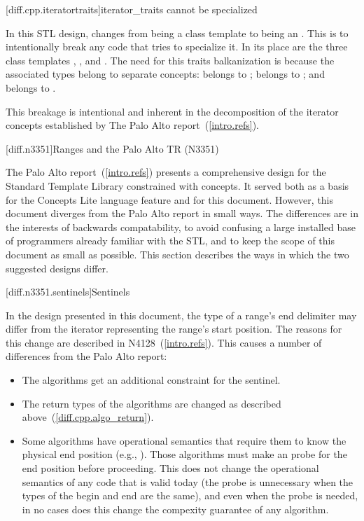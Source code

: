 [diff.cpp.iteratortraits]{iterator_traits cannot be specialized}

\pnum
In this STL design,  changes from being a class template to being an
. This is to intentionally break any code that tries to specialize it. In its place
are the three class templates , , and
. The need for this traits balkanization is because the associated types
belong to separate concepts:  belongs to ;
 belongs to ; and  belongs to
.

\pnum
This breakage is intentional and inherent in the decomposition of the iterator concepts established
by The Palo Alto report~(\ref{intro.refs}).

[diff.n3351]{Ranges and the Palo Alto TR (N3351)}

\pnum
The Palo Alto report~(\ref{intro.refs}) presents a comprehensive design for the Standard Template
Library constrained with concepts. It served both as a basis for the Concepts Lite language feature
and for this document. However, this document diverges from the Palo Alto report in small ways. The
differences are in the interests of backwards compatability, to avoid confusing a large installed
base of programmers already familiar with the STL, and to keep the scope of this document as small
as possible. This section describes the ways in which the two suggested designs differ.

[diff.n3351.sentinels]{Sentinels}

\pnum
In the design presented in this document, the type of a range's end delimiter may differ from the
iterator representing the range's start position. The reasons for this change are described in
N4128~(\ref{intro.refs}). This causes a number of differences from the Palo Alto report:

\begin{itemize}
\item The algorithms get an additional constraint for the sentinel.
\item The return types of the algorithms are changed as described above~(\ref{diff.cpp.algo_return}).
\item Some algorithms have operational semantics that require them to know the
physical end position (e.g., ). Those algorithms must make an  probe for
the end position before proceeding. This does not change the operational semantics of any code that
is valid today (the probe is unnecessary when the types of the begin and end are the
same), and even when the probe is needed, in no cases does this change the compexity guarantee of
any algorithm.
\end{itemize}

